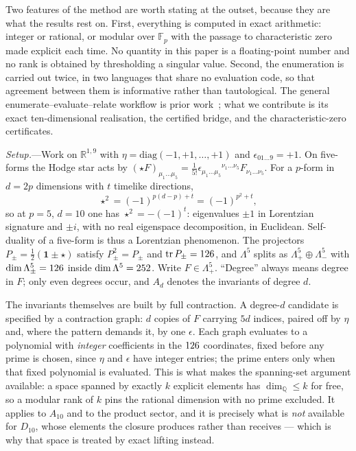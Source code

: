\documentclass[
  aps,prd,
  reprint,
  letterpaper,
  amsmath,amssymb,
  nofootinbib,
  superscriptaddress
]{revtex4-2}
\theoremstyle{plain}
\newcommand{\Ften}{A_{10}}
\newcommand{\Dten}{D_{10}}
\newcommand{\Fp}{\mathbb{F}_p}
\newcommand{\Q}{\mathbb{Q}}
\begin{document}
Two features of the method are worth stating at the outset, because they are
what the results rest on. First, everything is computed in exact arithmetic:
integer or rational, or modular over $\Fp$ with the passage to characteristic
zero made explicit each time. No quantity in this paper is a floating-point
number and no rank is obtained by thresholding a singular value. Second, the
enumeration is carried out twice, in two languages that share no evaluation
code, so that agreement between them is informative rather than tautological.
The general enumerate--evaluate--relate workflow is prior
work~\cite{Elamaran:2025mlinv}; what we contribute is its exact ten-dimensional
realisation, the certified bridge, and the characteristic-zero certificates.

\emph{Setup.}---Work on $\mathbb{R}^{1,9}$ with
$\eta=\mathrm{diag}(-1,+1,\dots,+1)$ and $\epsilon_{01\dots9}=+1$. On five-forms
the Hodge star acts by
$(\star F)_{\mu_1\dots\mu_5}=\frac{1}{5!}\epsilon_{\mu_1\dots\mu_5}{}^{\nu_1\dots\nu_5}F_{\nu_1\dots\nu_5}$.
For a $p$-form in $d=2p$ dimensions with $t$ timelike directions,
\begin{equation}
\star^{2}=(-1)^{p(d-p)+t}=(-1)^{p^{2}+t},
\label{eq:starsq}
\end{equation}
so at $p=5$, $d=10$ one has $\star^2=-(-1)^t$: eigenvalues $\pm1$ in Lorentzian
signature and $\pm i$, with no real eigenspace decomposition, in Euclidean.
Self-duality of a five-form is thus a Lorentzian phenomenon. The projectors
$P_\pm=\frac12(\mathbf{1}\pm\star)$ satisfy $P_\pm^2=P_\pm$ and
$\operatorname{tr}P_\pm=126$, and $\Lambda^5$ splits as
$\Lambda^5_+\oplus\Lambda^5_-$ with
$\dim\Lambda^5_\pm=126$ inside
$\dim\Lambda^5=252$. Write $F\in\Lambda^5_+$. ``Degree''
always means degree in $F$; only even degrees occur, and $A_d$ denotes the
invariants of degree $d$.

The invariants themselves are built by full contraction. A degree-$d$ candidate
is specified by a contraction graph: $d$ copies of $F$ carrying $5d$ indices,
paired off by $\eta$ and, where the pattern demands it, by one $\epsilon$. Each
graph evaluates to a polynomial with \emph{integer} coefficients in the
$126$ coordinates, fixed before any prime is chosen, since $\eta$
and $\epsilon$ have integer entries; the prime enters only when that fixed
polynomial is evaluated. This is what makes the spanning-set argument available:
a space spanned by exactly $k$ explicit elements has $\dim_\Q\le k$ for free, so
a modular rank of $k$ pins the rational dimension with no prime excluded. It
applies to $\Ften$ and to the product sector, and it is precisely what is
\emph{not} available for $\Dten$, whose elements the closure produces rather
than receives --- which is why that space is treated by exact lifting instead.
\end{document}
